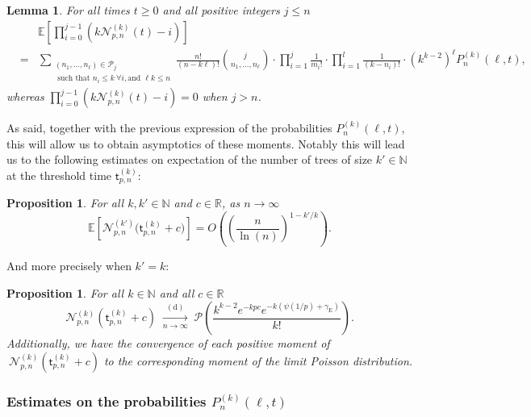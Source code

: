 \documentclass[a4, 11pt]{article}
\numberwithin{equation}{section}
\theoremstyle{plain}
\newtheorem{lemma}[theorem]{Lemma}
\newtheorem{proposition}[theorem]{Proposition}
\theoremstyle{definition}
\theoremstyle{remark}
\begin{document}
\begin{lemma} 
\label{lem:factorial_moments}
For all times $t\geq 0$ and all positive integers $j \leq n$ 
\begin{eqnarray*}
&& \mathbb E\left[\prod_{i=0}^{j-1}(k\mathcal N_{p,n}^{(k)}(t)-i) \right] \\
&=& 
\sum_{\substack{(n_1,\ldots,n_\ell) \in \mathcal P_j  \\ \text{ such that } n_i \leq k \: \forall i, \text{and }\ell k\leq n}} \frac{n!}{(n-k\ell)!} \binom{j}{n_1,\ldots,n_\ell} \cdot \prod_{i=1}^j \frac{1}{m_i!} \cdot \prod_{i=1}^l\frac{1}{(k-n_i)!} \cdot (k^{k-2})^\ell P^{(k)}_n(\ell,t),
\end{eqnarray*}
whereas $\prod_{i=0}^{j-1}(k\mathcal N_{p,n}^{(k)}(t)-i)=0$ when $j>n$.
\end{lemma}

As said, together with the previous expression of the probabilities $P^{(k)}_n\left(\ell,t\right)$, this will allow us to obtain asymptotics of these moments. Notably this will lead us to the following estimates on expectation of the number of trees of size $k' \in \mathbb N$ at the threshold time $\mathsf t^{(k)}_{p,n}$: 


\begin{proposition}
\label{cor:boundsexp}
For all $k,k' \in \mathbb N$ and $c \in \mathbb R$, as $n\rightarrow \infty$
$$\mathbb E\left[\mathcal N_{p,n}^{(k')}\big(\mathsf t^{(k)}_{p,n}+c \big)\right] = O\left( \left(\frac{n}{\ln(n)} \right)^{1-k'/k} \right).$$
\end{proposition}

And more precisely when $k'=k$:

\begin{proposition}
\label{prop:Poisson_continu}
For all $k \in \mathbb N$ and all $c \in \mathbb R$
$$
\mathcal N_{p,n}^{(k)}(\mathsf t^{(k)}_{p,n}+c) \; \underset{n \rightarrow \infty}{\overset{(\mathrm d)}\longrightarrow} \; \mathcal P\left(\frac{k^{k-2}e^{-kpc} e^{-k\left(\psi(1/p)+\gamma_{\mathrm E}\right)}}{k!} \right).
$$
Additionally, we have the convergence of each positive moment of $~\mathcal N_{p,n}^{(k)}(\mathsf t^{(k)}_{p,n}+c)$ to the corresponding moment of the limit Poisson distribution.
\end{proposition}



\subsubsection{Estimates on the probabilities $P_n^{(k)}(\ell,t)$}
\label{sub:probaPnk}
\end{document}
